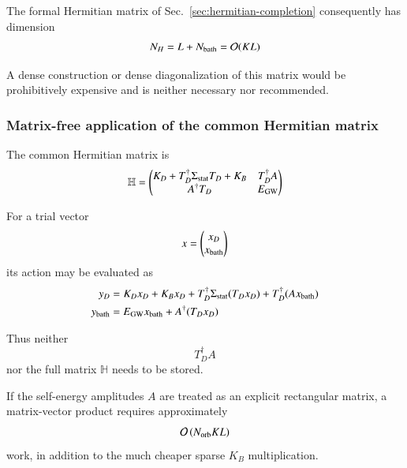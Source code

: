\documentclass[aip,jcp,reprint,noshowkeys,superscriptaddress]{revtex4-1}
\begin{document}
The formal Hermitian matrix of Sec.~\ref{sec:hermitian-completion} consequently has dimension
\begin{equation}
  N_H
  =
  L+N_{\rm bath}
  =
  \mathcal O(KL)
  \label{eq:Hdimension}
\end{equation}

A dense construction or dense diagonalization of this matrix would be
prohibitively expensive and is neither necessary nor recommended.


\subsubsection{Matrix-free application of the common Hermitian matrix}

The common Hermitian matrix is
\begin{equation}
  \mathbb H
  =
  \begin{pmatrix}
    K_D
    +
    T_D^\dagger
    \Sigma_{\rm stat}
    T_D
    +
    K_B
    &
    T_D^\dagger A
    \\
    A^\dagger T_D
    &
    E_{\rm GW}
  \end{pmatrix}
\end{equation}

For a trial vector
\begin{equation}
  x
  =
  \begin{pmatrix}
    x_D\\
    x_{\rm bath}
  \end{pmatrix}
\end{equation}
its action may be evaluated as
\begin{subequations}
  \begin{align}
    y_D
    ={}&
    K_Dx_D
    +
    K_Bx_D
    +
    T_D^\dagger
    \Sigma_{\rm stat}
    (T_Dx_D)
    +
    T_D^\dagger
    (Ax_{\rm bath})
    \\
    y_{\rm bath}
    ={}&
    E_{\rm GW}x_{\rm bath}
    +
    A^\dagger(T_Dx_D)
  \end{align}
\end{subequations}

Thus neither
\begin{equation}
  T_D^\dagger A
\end{equation}
nor the full matrix $\mathbb H$ needs to be stored.

If the self-energy amplitudes $A$ are treated as an explicit
rectangular matrix, a matrix-vector product requires approximately
\begin{equation}
  \mathcal O
  \left(
    N_{\rm orb} K L
  \right)
  \label{eq:H-matvec-cost}
\end{equation}
work, in addition to the much cheaper sparse $K_B$ multiplication.
\end{document}
